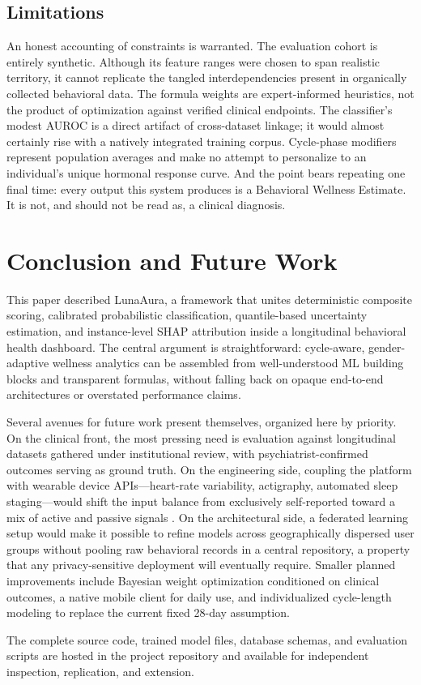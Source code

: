 \documentclass[conference]{IEEEtran}
\begin{document}
\subsection{Limitations}

An honest accounting of constraints is warranted. The evaluation cohort is entirely synthetic. Although its feature ranges were chosen to span realistic territory, it cannot replicate the tangled interdependencies present in organically collected behavioral data. The formula weights are expert-informed heuristics, not the product of optimization against verified clinical endpoints. The classifier's modest AUROC is a direct artifact of cross-dataset linkage; it would almost certainly rise with a natively integrated training corpus. Cycle-phase modifiers represent population averages and make no attempt to personalize to an individual's unique hormonal response curve. And the point bears repeating one final time: every output this system produces is a Behavioral Wellness Estimate. It is not, and should not be read as, a clinical diagnosis.

\section{Conclusion and Future Work}

This paper described LunaAura, a framework that unites deterministic composite scoring, calibrated probabilistic classification, quantile-based uncertainty estimation, and instance-level SHAP attribution inside a longitudinal behavioral health dashboard. The central argument is straightforward: cycle-aware, gender-adaptive wellness analytics can be assembled from well-understood ML building blocks and transparent formulas, without falling back on opaque end-to-end architectures or overstated performance claims.

Several avenues for future work present themselves, organized here by priority. On the clinical front, the most pressing need is evaluation against longitudinal datasets gathered under institutional review, with psychiatrist-confirmed outcomes serving as ground truth. On the engineering side, coupling the platform with wearable device APIs---heart-rate variability, actigraphy, automated sleep staging---would shift the input balance from exclusively self-reported toward a mix of active and passive signals \cite{torous2021digital}. On the architectural side, a federated learning setup \cite{wu2021federated} would make it possible to refine models across geographically dispersed user groups without pooling raw behavioral records in a central repository, a property that any privacy-sensitive deployment will eventually require. Smaller planned improvements include Bayesian weight optimization conditioned on clinical outcomes, a native mobile client for daily use, and individualized cycle-length modeling to replace the current fixed 28-day assumption.

The complete source code, trained model files, database schemas, and evaluation scripts are hosted in the project repository and available for independent inspection, replication, and extension.



\end{document}

